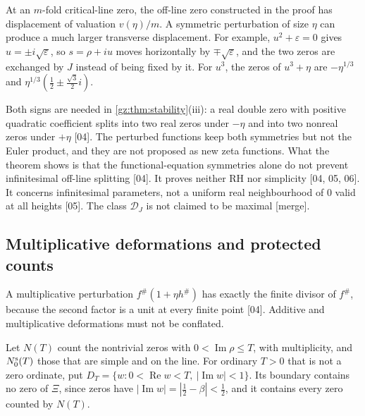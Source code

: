 \documentclass[11pt,a4paper]{article}
\numberwithin{equation}{section}
\theoremstyle{definition}
\theoremstyle{remark}
\newcommand{\eps}{\varepsilon}
\renewcommand{\Re}{\operatorname{Re}}
\renewcommand{\Im}{\operatorname{Im}}
\newcommand{\DJs}{\mathcal D_{J}}
\newcommand{\src}[1]{\textup{[#1]}}
\newcommand{\merge}{\textup{[merge]}}
\begin{document}
\begin{corollary}[Splitting scale \src{04, 06}]\label{gz:cor:scale}
At an $m$-fold critical-line zero, the off-line zero constructed in the
proof has displacement of valuation $v(\eta)/m$. A symmetric perturbation of
size $\eta$ can produce a much larger transverse displacement. For example,
$u^2+\eps=0$ gives $u=\pm i\sqrt\eps$, so $s=\rho+iu$ moves horizontally by
$\mp\sqrt\eps$, and the two zeros are exchanged by $J$ instead of being
fixed by it. For $u^3$, the zeros of $u^3+\eta$ are $-\eta^{1/3}$ and
$\eta^{1/3}(\tfrac12\pm\tfrac{\sqrt3}2i)$.
\end{corollary}
Both signs are needed in \cref{gz:thm:stability}(iii): a real double zero
with positive quadratic coefficient splits into two real zeros under
$-\eta$ and into two nonreal zeros under $+\eta$ \src{04}. The perturbed
functions keep both symmetries but not the Euler product, and they are not
proposed as new zeta functions. What the theorem shows is that the
functional-equation symmetries alone do not prevent infinitesimal off-line
splitting \src{04}. It proves neither RH nor simplicity \src{04, 05, 06}.
It concerns infinitesimal parameters, not a uniform real neighbourhood of
$0$ valid at all heights \src{05}. The class $\DJs$ is not claimed to be
maximal \merge.

\subsection{Multiplicative deformations and protected counts}\label{gz:sec:protected}
A multiplicative perturbation $f^\#(1+\eta h^\#)$ has exactly the finite
divisor of $f^\#$, because the second factor is a unit at every finite
point \src{04}. Additive and multiplicative deformations must not be
conflated.

Let $N(T)$ count the nontrivial zeros with $0<\Im\rho\le T$, with
multiplicity, and $N_0^{\rm s}(T)$ those that are simple and on the line.
For ordinary $T>0$ that is not a zero ordinate, put
$D_T=\{w:0<\Re w<T,\ |\Im w|<1\}$. Its boundary contains no zero of $\Xi$,
since zeros have $|\Im w|=|\tfrac12-\beta|<\tfrac12$, and it contains every
zero counted by $N(T)$.
\end{document}
